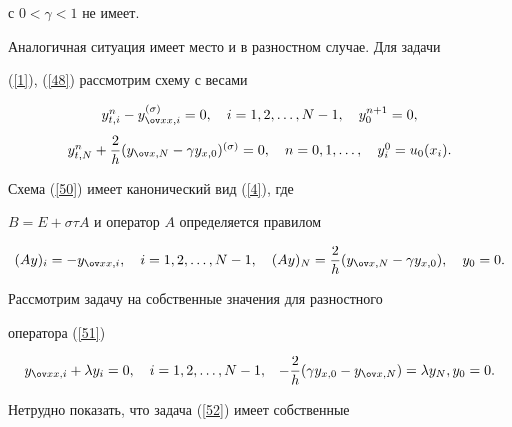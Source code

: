 с $0<\gamma <1$ не имеет.








Аналогичная ситуация имеет место и в разностном случае. Для задачи


(\ref{1}), (\ref{48}) рассмотрим схему с весами


\begin{equation}\label{50}


\begin{array}{c}


{y_{t,i}^n-y_{\ov xx,i}^{(\sigma)}=0,


\quad i=1,2,\dotsc,N-1,\quad y_0^{n+1}=0,} \\[3mm]


{y_{t,N}^n+{\dfrac{2}{h}}({y_{\ov x,N}-\gamma y_{x,0}})^{(\sigma)}


=0,\quad n=0,1,\dotsc,\quad


y_{i}^{0}=u_{0}(x_{i}).}


\end{array}


\end{equation}


Схема (\ref{50}) имеет канонический вид (\ref{4}), где 


$B=E+\sigma \tau A$ и оператор $A$ определяется правилом


\begin{equation}\label{51}


(Ay)_{i}=-y_{\ov x x,i},\quad i=1,2,\dotsc, N-1,\quad


(Ay)_{N}=\frac{2}{h}(y_{\ov x,N}-\gamma y_{x,0}), \quad y_{0}=0.


\end{equation}





Рассмотрим задачу на собственные значения для разностного


оператора (\ref{51})


\begin{equation}\label{52}


{y_{\ov xx,i}+\lambda y_i=0,\quad i=1,2,\dotsc,N-1,}


{\quad-{\dfrac{2}{h}}({\gamma y_{x,0}-y_{\ov x,N}})


=\lambda y_N, y_0=0.} 


\end{equation}


Нетрудно показать, что задача (\ref{52}) имеет собственные


